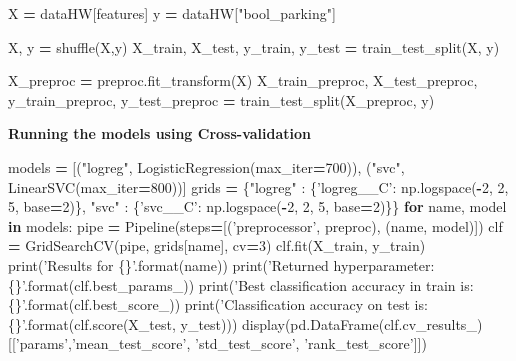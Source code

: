 \documentclass[10pt,a4paper]{article}
\newenvironment{Shaded}{\begin{snugshade}}{\end{snugshade}}
\newcommand{\BuiltInTok}[1]{#1}
\newcommand{\ControlFlowTok}[1]{\textcolor[rgb]{0.13,0.29,0.53}{\textbf{#1}}}
\newcommand{\DecValTok}[1]{\textcolor[rgb]{0.00,0.00,0.81}{#1}}
\newcommand{\KeywordTok}[1]{\textcolor[rgb]{0.13,0.29,0.53}{\textbf{#1}}}
\newcommand{\NormalTok}[1]{#1}
\newcommand{\OperatorTok}[1]{\textcolor[rgb]{0.81,0.36,0.00}{\textbf{#1}}}
\newcommand{\SpecialCharTok}[1]{\textcolor[rgb]{0.00,0.00,0.00}{#1}}
\newcommand{\StringTok}[1]{\textcolor[rgb]{0.31,0.60,0.02}{#1}}
\theoremstyle{break}
\begin{document}
\begin{Shaded}
\begin{Highlighting}[]
\NormalTok{X }\OperatorTok{=}\NormalTok{ dataHW[features]}
\NormalTok{y }\OperatorTok{=}\NormalTok{ dataHW[}\StringTok{"bool_parking"}\NormalTok{]}

\NormalTok{X, y }\OperatorTok{=}\NormalTok{ shuffle(X,y)}
\NormalTok{X_train, X_test, y_train, y_test }\OperatorTok{=}\NormalTok{ train_test_split(X, y)}

\NormalTok{X_preproc }\OperatorTok{=}\NormalTok{ preproc.fit_transform(X)}
\NormalTok{X_train_preproc, X_test_preproc, y_train_preproc, y_test_preproc }\OperatorTok{=}\NormalTok{ train_test_split(X_preproc, y)}
\end{Highlighting}
\end{Shaded}

\textbf{Running the models using Cross-validation}

\begin{Shaded}
\begin{Highlighting}[]
\NormalTok{models }\OperatorTok{=}\NormalTok{ [(}\StringTok{"logreg"}\NormalTok{, LogisticRegression(max_iter}\OperatorTok{=}\DecValTok{700}\NormalTok{)),}
\NormalTok{          (}\StringTok{"svc"}\NormalTok{, LinearSVC(max_iter}\OperatorTok{=}\DecValTok{800}\NormalTok{))]}
\NormalTok{grids }\OperatorTok{=}\NormalTok{ \{}\StringTok{"logreg"}\NormalTok{ : \{}\StringTok{'logreg__C'}\NormalTok{: np.logspace(}\OperatorTok{-}\DecValTok{2}\NormalTok{, }\DecValTok{2}\NormalTok{, }\DecValTok{5}\NormalTok{, base}\OperatorTok{=}\DecValTok{2}\NormalTok{)\},}
         \StringTok{"svc"}\NormalTok{ : \{}\StringTok{'svc__C'}\NormalTok{: np.logspace(}\OperatorTok{-}\DecValTok{2}\NormalTok{, }\DecValTok{2}\NormalTok{, }\DecValTok{5}\NormalTok{, base}\OperatorTok{=}\DecValTok{2}\NormalTok{)\}\}}
\ControlFlowTok{for}\NormalTok{ name, model }\KeywordTok{in}\NormalTok{ models:}
\NormalTok{    pipe }\OperatorTok{=}\NormalTok{ Pipeline(steps}\OperatorTok{=}\NormalTok{[(}\StringTok{'preprocessor'}\NormalTok{, preproc), (name, model)])}
\NormalTok{    clf }\OperatorTok{=}\NormalTok{ GridSearchCV(pipe, grids[name], cv}\OperatorTok{=}\DecValTok{3}\NormalTok{)}
\NormalTok{    clf.fit(X_train, y_train)}
    \BuiltInTok{print}\NormalTok{(}\StringTok{'Results for }\SpecialCharTok{\{\}}\StringTok{'}\NormalTok{.}\BuiltInTok{format}\NormalTok{(name))}
    \BuiltInTok{print}\NormalTok{(}\StringTok{'Returned hyperparameter: }\SpecialCharTok{\{\}}\StringTok{'}\NormalTok{.}\BuiltInTok{format}\NormalTok{(clf.best_params_))}
    \BuiltInTok{print}\NormalTok{(}\StringTok{'Best classification accuracy in train is: }\SpecialCharTok{\{\}}\StringTok{'}\NormalTok{.}\BuiltInTok{format}\NormalTok{(clf.best_score_))}
    \BuiltInTok{print}\NormalTok{(}\StringTok{'Classification accuracy on test is: }\SpecialCharTok{\{\}}\StringTok{'}\NormalTok{.}\BuiltInTok{format}\NormalTok{(clf.score(X_test, y_test)))    }
\NormalTok{    display(pd.DataFrame(clf.cv_results_)[[}\StringTok{'params'}\NormalTok{,}\StringTok{'mean_test_score'}\NormalTok{, }\StringTok{'std_test_score'}\NormalTok{,}
                                           \StringTok{'rank_test_score'}\NormalTok{]])}
\end{Highlighting}
\end{Shaded}
\end{document}
